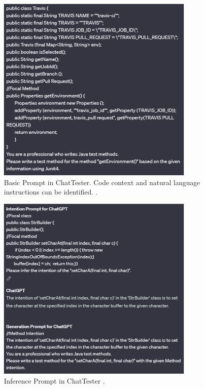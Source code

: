 \begin{figure}[!h]
    \includegraphics[width=0.86\textwidth]{figures/basicprompt.jpg}
    \caption{Basic Prompt in ChatTester. Code context and natural language instructions can be identified. \citep{kn:chattester}.}
    \label{fig:basprompt}
\end{figure}
\begin{figure}[!h]
    \includegraphics[width=0.86\textwidth]{figures/inferenceprompt.jpg}
    \caption{Inference Prompt in ChatTester \citep{kn:chattester}.}
    \label{fig:inf}
\end{figure}

